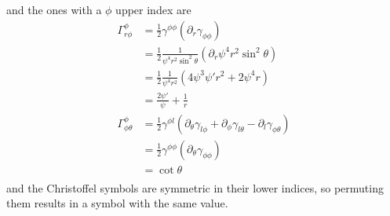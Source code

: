 \documentclass[12pt]{article}
\numberwithin{equation}{section}
\begin{document}
and the ones with a $\phi$ upper index are
\begin{equation}
\begin{aligned}
\Gamma^{\phi}_{r \phi} &= \frac{1}{2} \gamma^{\phi \phi} (\partial_r \gamma_{\phi \phi}) \\
&= \frac{1}{2} \frac{1}{\psi^4 r^2 \sin^2 \theta} (\partial_r \psi^4 r^2 \sin^2 \theta) \\
&= \frac{1}{2} \frac{1}{\psi^4 r^2} (4 \psi^3 \psi' r^2 + 2 \psi^4 r) \\
&= \frac{2 \psi'}{\psi} + \frac{1}{r} \\
\Gamma^{\phi}_{\phi \theta} &= \frac{1}{2} \gamma^{\phi l} (\partial_\theta \gamma_{l \phi} + \partial_\phi \gamma_{l \theta} - \partial_l \gamma_{\phi \theta}) \\
&= \frac{1}{2} \gamma^{\phi \phi} (\partial_\theta \gamma_{\phi \phi}) \\
&= \cot \theta \\
\end{aligned}
\end{equation}
and the Christoffel symbols are symmetric in their lower indices, so permuting them results in a symbol with the same value.
\end{document}
